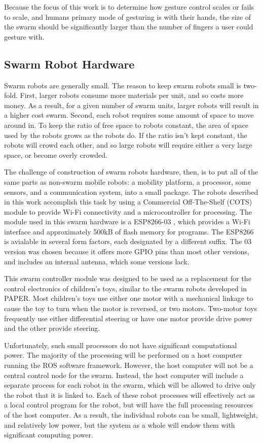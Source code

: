 \documentclass[]{article}
\begin{document}
Because the focus of this work is to determine how gesture control scales or fails to scale, and humans primary mode of gesturing is with their hands, the size of the swarm should be significantly larger than the number of fingers a user could gesture with. 

\subsection{Swarm Robot Hardware}

Swarm robots are generally small. 
The reason to keep swarm robots small is two-fold. 
First, larger robots consume more materials per unit, and so costs more money.
As a result, for a given number of swarm units, larger robots will result in a higher cost swarm. 
Second, each robot requires some amount of space to move around in. 
To keep the ratio of free space to robots constant, the area of space used by the robots grows as the robots do. 
If the ratio isn't kept constant, the robots will crowd each other, and so large robots will require either a very large space, or become overly crowded.

The challenge of construction of swarm robots hardware, then, is to put all of the same parts as non-swarm mobile robots: a mobility platform, a processor, some sensors, and a communication system, into a small package.  
The robots described in this work accomplish this task by using a Commercial Off-The-Shelf (COTS) module to provide Wi-Fi connectivity and a microcontroller for processing. 
The module used in this swarm hardware is a ESP8266-03  , which provides a Wi-Fi interface and approximately 500kB of flash memory for programs. 
The ESP8266 is avialable in several form factors, each designated by a different suffix. 
The 03 version was chosen because it offers more GPIO pins than most other versions, and includes an internal antenna, which some versions lack. 

This swarm controller module was designed to be used as a replacement for the control electronics of children's toys, similar to the  swarm robots developed in PAPER. 
Most children's toys use either one motor with a mechanical linkage to cause the toy to turn when the motor is reversed, or two motors.
Two-motor toys frequently use either differential steering or have one motor provide drive power and the other provide steering. 

Unfortunately, such small processors do not have significant computational power. 
The majority of the processing will be performed on a host computer running the ROS software framework. 
However, the host computer will not be a central control node for the swarm. 
Instead, the host computer will include a separate process for each robot in the swarm, which will be allowed to drive only the robot that it is linked to. 
Each of these robot processes will effectively act as a local control program for the robot, but will have the full processing resources of the host computer. 
As a result, the individual robots can be small, lightweight, and relatively low power, but the system as a whole will endow them with significant computing power. 
\end{document}
